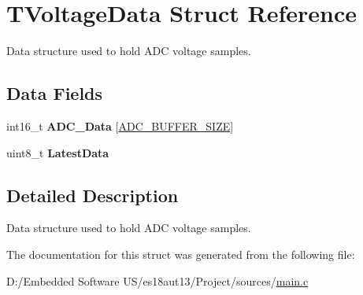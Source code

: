 \hypertarget{struct_t_voltage_data}{}\section{T\+Voltage\+Data Struct Reference}
\label{struct_t_voltage_data}


Data structure used to hold A\+D\+C voltage samples.  


\subsection*{Data Fields}
\begin{DoxyCompactItemize}
\item 
\hypertarget{struct_t_voltage_data_a0587896a202302e4c0d4e4a37788d3d0}{}int16\+\_\+t {\bfseries A\+D\+C\+\_\+\+Data} \mbox{[}\hyperlink{group__main__module_ga602abb8ec84dcb3b6f854a738310ea46}{A\+D\+C\+\_\+\+B\+U\+F\+F\+E\+R\+\_\+\+S\+I\+Z\+E}\mbox{]}\label{struct_t_voltage_data_a0587896a202302e4c0d4e4a37788d3d0}

\item 
\hypertarget{struct_t_voltage_data_ade636a733cf7e618d9ddcc34211c257d}{}uint8\+\_\+t {\bfseries Latest\+Data}\label{struct_t_voltage_data_ade636a733cf7e618d9ddcc34211c257d}

\end{DoxyCompactItemize}


\subsection{Detailed Description}
Data structure used to hold A\+D\+C voltage samples. 



The documentation for this struct was generated from the following file\+:\begin{DoxyCompactItemize}
\item 
D\+:/\+Embedded Software U\+S/es18aut13/\+Project/sources/\hyperlink{main_8c}{main.\+c}\end{DoxyCompactItemize}
